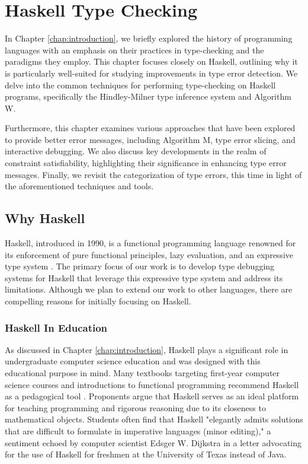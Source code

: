 
\chapter{Haskell Type Checking} %

\label{chap:haskell-type-checking}

\graphicspath{{Figures/HaskellTypeChecking}}

In Chapter \ref{chap:introduction}, we briefly explored the history of programming languages with an emphasis on their practices in type-checking and the paradigms they employ. This chapter focuses closely on Haskell, outlining why it is particularly well-suited for studying improvements in type error detection. We delve into the common techniques for performing type-checking on Haskell programs, specifically the Hindley-Milner type inference system and Algorithm W.

Furthermore, this chapter examines various approaches that have been explored to provide better error messages, including Algorithm M, type error slicing, and interactive debugging. We also discuss key developments in the realm of constraint satisfiability, highlighting their significance in enhancing type error messages. Finally, we revisit the categorization of type errors, this time in light of the aforementioned techniques and tools.

\section{Why Haskell}

Haskell, introduced in 1990, is a functional programming language renowned for its enforcement of pure functional principles, lazy evaluation, and an expressive type system \cite{Hudak2007-kn}. The primary focus of our work is to develop type debugging systems for Haskell that leverage this expressive type system and address its limitations. Although we plan to extend our work to other languages, there are compelling reasons for initially focusing on Haskell.

\subsection*{Haskell In Education}
As discussed in Chapter \ref{chap:introduction}, Haskell plays a significant role in undergraduate computer science education and was designed with this educational purpose in mind. Many textbooks targeting first-year computer science courses and introductions to functional programming recommend Haskell as a pedagogical tool \cite{Bird1998-kv, Davie1992-xv}. Proponents argue that Haskell serves as an ideal platform for teaching programming and rigorous reasoning due to its closeness to mathematical objects. Students often find that Haskell "elegantly admits solutions that are difficult to formulate in imperative languages (minor editing)," a sentiment echoed by computer scientist Edsger W. Dijkstra in a letter advocating for the use of Haskell for freshmen at the University of Texas instead of Java.

